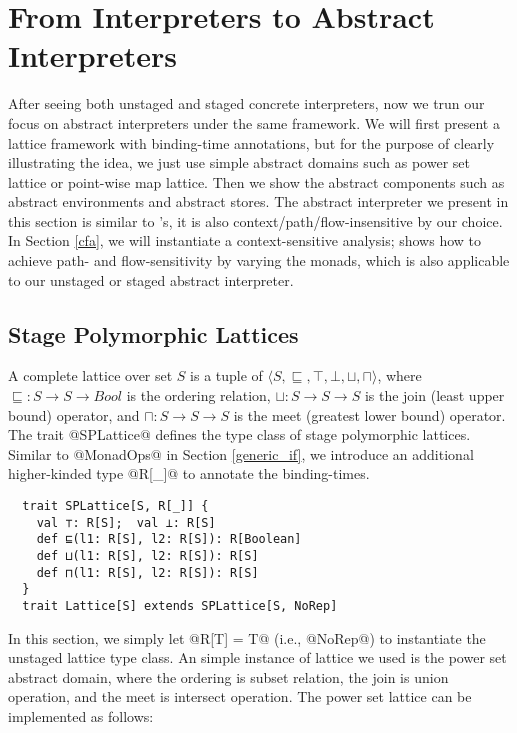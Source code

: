 \section{From Interpreters to Abstract Interpreters} \label{unstaged_abs}

After seeing both unstaged and staged concrete interpreters, now we trun our
focus on abstract interpreters under the same framework. We will first present a
lattice framework with binding-time annotations, but for the purpose of clearly
illustrating the idea, we just use simple abstract domains such as power set
lattice or point-wise map lattice. Then we show the abstract components such as
abstract environments and abstract stores.
The abstract interpreter we present in this section is similar to
\citet{DBLP:journals/pacmpl/DaraisLNH17}'s, it is also
context/path/flow-insensitive by our choice.  In Section \ref{cfa}, we will
instantiate a context-sensitive analysis;
\citet{Darais:2015:GTM:2814270.2814308} shows how to achieve path- and
flow-sensitivity by varying the monads, which is also applicable to our unstaged
or staged abstract interpreter.

\subsection{Stage Polymorphic Lattices} \label{stagedpoly_lat}

A complete lattice over set $S$ is a tuple of $\langle S, \sqsubseteq, \top,
\bot, \sqcup, \sqcap \rangle$, where $\sqsubseteq : S \to S \to Bool$ is the
ordering relation, $\sqcup: S \to S \to S$ is the join (least upper bound)
operator, and $\sqcap: S \to S \to S$ is the meet (greatest lower bound)
operator. The trait @SPLattice@ defines the type class of stage polymorphic
lattices. Similar to @MonadOps@ in Section \ref{generic_if}, we introduce an
additional higher-kinded type @R[_]@ to annotate the binding-times.

\begin{lstlisting}
  trait SPLattice[S, R[_]] {
    val ⊤: R[S];  val ⊥: R[S]
    def ⊑(l1: R[S], l2: R[S]): R[Boolean]
    def ⊔(l1: R[S], l2: R[S]): R[S]
    def ⊓(l1: R[S], l2: R[S]): R[S]
  }
  trait Lattice[S] extends SPLattice[S, NoRep]
\end{lstlisting}

In this section, we simply let @R[T] = T@ (i.e., @NoRep@) to instantiate the
unstaged lattice type class. An simple instance of lattice we used is the power
set abstract domain, where the ordering is subset relation, the join is union
operation, and the meet is intersect operation. The power set lattice can be
implemented as follows:

